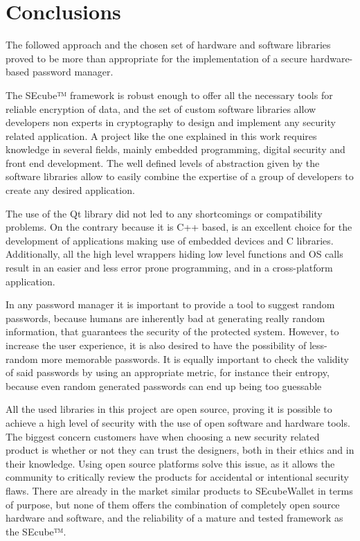 \chapter{Conclusions} \label{chap:con}

The followed approach and the chosen set of hardware and software libraries proved to be more than appropriate for the implementation of a secure hardware-based password manager.

\vspace{7pt}

The SEcube™ framework is robust enough to offer all the necessary tools for reliable encryption of data, and the set of custom software libraries allow developers non experts in cryptography to design and implement any security related application. A project like the one explained in this work requires knowledge in several fields, mainly embedded programming, digital security and front end development. The well defined levels of abstraction given by the software libraries allow to easily combine the expertise of a group of developers to create any desired application.

\vspace{7pt}

The use of the Qt library did not led to any shortcomings or compatibility problems. On the contrary because it is C++ based, is an excellent choice for the development of applications making use of embedded devices and C libraries. Additionally, all the high level wrappers hiding low level functions and OS calls result in an easier and less error prone programming, and in a cross-platform application.

\vspace{7pt}

In any password manager it is important to provide a tool to suggest random passwords, because humans are inherently bad at generating really random information, that guarantees the security of the protected system. However, to increase the user experience, it is also desired to have the possibility of less-random more memorable passwords. It is equally important to check the validity of said passwords by using an appropriate metric, for instance their entropy, because even random generated passwords can end up being too guessable

\vspace{7pt}

All the used libraries in this project are open source, proving it is possible to achieve a high level of security with the use of open software and hardware tools. The biggest concern customers have when choosing a new security related product is whether or not they can trust the designers, both in their ethics and in their knowledge. Using open source platforms solve this issue, as it allows the community to critically review the products for accidental or intentional security flaws. There are already in the market similar products to SEcubeWallet in terms of purpose, but none of them offers the combination of completely open source hardware and software, and the reliability of a mature and tested framework as the SEcube™.

